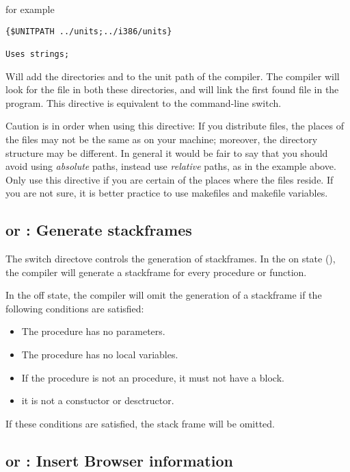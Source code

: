 \documentclass{report}
\begin{document}
for example
\begin{verbatim}
{$UNITPATH ../units;../i386/units}

Uses strings;
\end{verbatim}

Will add the directories  and  to the unit
path of the compiler. The compiler will look for the file 
in both these directories, and will link the first found file in the
program. This directive is equivalent to the  command-line switch.

Caution is in order when using this directive: If you distribute files, the 
places of the files may not be the same as on your machine; moreover, the
directory structure may be different. In general it would be fair to say
that you should avoid using {\em absolute} paths, instead use {\em relative}
paths, as in the example above. Only use this directive if you are certain
of the places where the files reside. If you are not sure, it is better
practice to use makefiles and makefile variables.
 
\subsection{ or  : Generate stackframes}

The  switch directove controls the generation of stackframes.
In the on state (), the compiler will generate a
stackframe for every procedure or function.

In the off state, the compiler will omit the generation of a stackframe if
the following conditions are satisfied:
\begin{itemize}
\item The procedure has no parameters.
\item The procedure has no local variables.
\item If the procedure is not an  procedure, it must not have
a  block.
\item it is not a constuctor or desctructor.
\end{itemize}
If these conditions are satisfied, the stack frame will be omitted.

\subsection{ or  : Insert Browser information}
\end{document}
